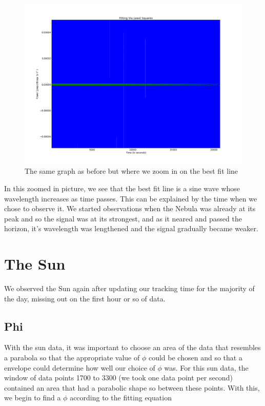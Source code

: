 \documentclass[12 pt]{article}
\begin{document}
\begin{figure}[H]
\centering
\includegraphics[scale=0.45]{crablsqfitzoom.png}
\caption{The same graph as before but where we zoom in on the best fit line}
\label{crablsqfitzoom}
\end{figure}

In this zoomed in picture, we see that the best fit line is a sine wave
whose wavelength increases as time passes. This can be explained by the
time when we chose to observe it. We started observations when the
Nebula was already at its peak and so the signal was at its strongest,
and as it neared and passed the horizon, it's
wavelength was lengthened and the signal gradually became weaker.  
\section*{The Sun}
We observed the Sun again after updating our tracking time for the majority of the day, missing out on
the first hour or so of data.
\subsection*{Phi}
With the sun data, it was important to choose an area of the data that
resembles a parabola so that the appropriate value of $\phi$ could be
chosen and so that a envelope could determine how well our choice of
$\phi$ was. For this sun data, the window of data points 1700 to 3300
(we took one data point per second) contained an
area that had a parabolic shape so between these points. With this, we
begin to find a
$\phi$ according to the fitting equation
\end{document}
